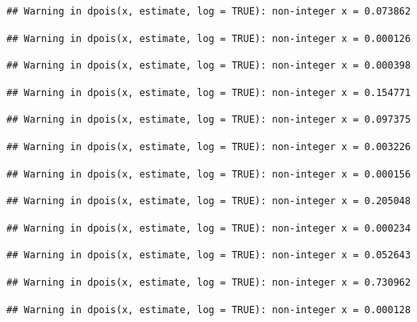 \documentclass[]{article}
\begin{document}
\begin{verbatim}
## Warning in dpois(x, estimate, log = TRUE): non-integer x = 0.073862
\end{verbatim}

\begin{verbatim}
## Warning in dpois(x, estimate, log = TRUE): non-integer x = 0.000126
\end{verbatim}

\begin{verbatim}
## Warning in dpois(x, estimate, log = TRUE): non-integer x = 0.000398
\end{verbatim}

\begin{verbatim}
## Warning in dpois(x, estimate, log = TRUE): non-integer x = 0.154771
\end{verbatim}

\begin{verbatim}
## Warning in dpois(x, estimate, log = TRUE): non-integer x = 0.097375
\end{verbatim}

\begin{verbatim}
## Warning in dpois(x, estimate, log = TRUE): non-integer x = 0.003226
\end{verbatim}

\begin{verbatim}
## Warning in dpois(x, estimate, log = TRUE): non-integer x = 0.000156
\end{verbatim}

\begin{verbatim}
## Warning in dpois(x, estimate, log = TRUE): non-integer x = 0.205048
\end{verbatim}

\begin{verbatim}
## Warning in dpois(x, estimate, log = TRUE): non-integer x = 0.000234
\end{verbatim}

\begin{verbatim}
## Warning in dpois(x, estimate, log = TRUE): non-integer x = 0.052643
\end{verbatim}

\begin{verbatim}
## Warning in dpois(x, estimate, log = TRUE): non-integer x = 0.730962
\end{verbatim}

\begin{verbatim}
## Warning in dpois(x, estimate, log = TRUE): non-integer x = 0.000128
\end{verbatim}
\end{document}
